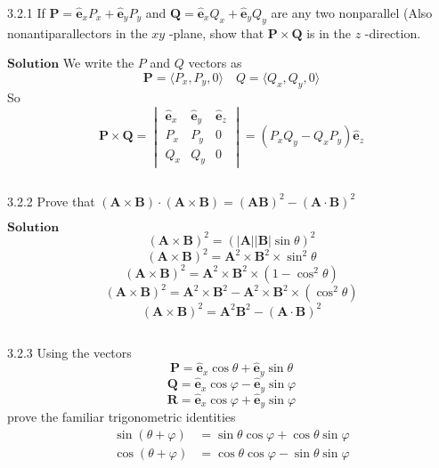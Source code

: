 


\begin{mybox}{3.2.1}
If $\mathbf{P}=\hat{\mathbf{e}}_{x} P_{x}+\hat{\mathbf{e}}_{y} P_{y}$ and $\mathbf{Q}=\hat{\mathbf{e}}_{x} Q_{x}+\hat{\mathbf{e}}_{y} Q_{y}$ are any two nonparallel (Also nonantiparallectors in the $x y$ -plane, show that $\mathbf{P} \times \mathbf{Q}$ is in the $z$ -direction.
\end{mybox}





$\boxed{\textbf{Solution}}$ We write the $P$ and $Q$ vectors as
$$\mathbf{P} = \langle P_x, P_y,0\rangle \quad Q = \langle Q_x, Q_y,0\rangle$$
So
$$\mathbf{P} \times \mathbf{Q} = \begin{vmatrix}
\hat{\mathbf{e}}_{x} & \hat{\mathbf{e}}_{y} & \hat{\mathbf{e}}_{z}\\ 
P_{x} & P_{y} & 0\\ 
Q_{x} & Q_{y} & 0
\end{vmatrix} =  (P_{x} Q_{y} - Q_{x} P_{y})\hat{\mathbf{e}}_{z}$$

$$$$


\begin{mybox}{3.2.2}
Prove that $(\mathbf{A} \times \mathbf{B}) \cdot(\mathbf{A} \times \mathbf{B})=(\mathbf{A} \mathbf{B})^{2}-(\mathbf{A} \cdot \mathbf{B})^{2}$
\end{mybox}


$\boxed{\textbf{Solution}}$
$$(\mathbf{A} \times \mathbf{B})^{2}=(|\mathbf{A}||\mathbf{B}| \sin \theta)^{2}$$
$$(\mathbf{A} \times \mathbf{B})^{2}=\mathbf{A}^{2} \times \mathbf{B}^{2} \times \sin ^{2} \theta$$
$$(\mathbf{A} \times \mathbf{B})^{2}=\mathbf{A}^{2} \times \mathbf{B}^{2} \times\left(1-\cos ^{2} \theta\right)$$
$$(\mathbf{A} \times \mathbf{B})^{2}=\mathbf{A}^{2} \times \mathbf{B}^{2}-\mathbf{A}^{2} \times \mathbf{B}^{2} \times\left(\cos ^{2} \theta\right)$$
$$(\mathbf{A} \times \mathbf{B})^{2}=\mathbf{A}^{2} \mathbf{B}^{2}-(\mathbf{A} \cdot \mathbf{B})^{2}$$

$$$$

\begin{mybox}{3.2.3}
Using the vectors
$$\mathbf{P}=\hat{\mathbf{e}}_{x} \cos \theta+\hat{\mathbf{e}}_{y} \sin \theta$$
$$\mathbf{Q}=\hat{\mathbf{e}}_{x} \cos \varphi-\hat{\mathbf{e}}_{y} \sin \varphi$$
$$\mathbf{R}=\hat{\mathbf{e}}_{x} \cos \varphi+\hat{\mathbf{e}}_{y} \sin \varphi$$
prove the familiar trigonometric identities
$$
\begin{aligned} \sin (\theta+\varphi) &=\sin \theta \cos \varphi+\cos \theta \sin \varphi \\ \cos (\theta+\varphi) &=\cos \theta \cos \varphi-\sin \theta \sin \varphi \end{aligned}
$$
\end{mybox}


